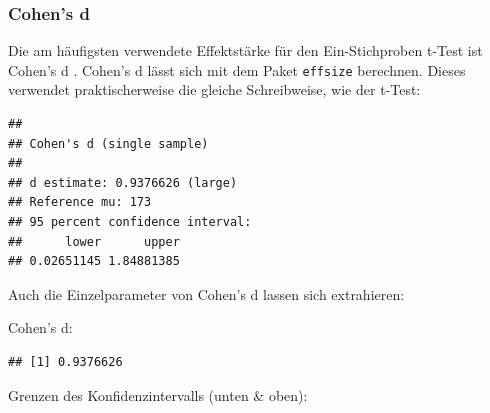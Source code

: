 \documentclass[
]{book}
\newenvironment{Shaded}{\begin{snugshade}}{\end{snugshade}}
\newcommand{\AttributeTok}[1]{\textcolor[rgb]{0.77,0.63,0.00}{#1}}
\newcommand{\ConstantTok}[1]{\textcolor[rgb]{0.00,0.00,0.00}{#1}}
\newcommand{\DecValTok}[1]{\textcolor[rgb]{0.00,0.00,0.81}{#1}}
\newcommand{\FunctionTok}[1]{\textcolor[rgb]{0.00,0.00,0.00}{#1}}
\newcommand{\NormalTok}[1]{#1}
\newcommand{\SpecialCharTok}[1]{\textcolor[rgb]{0.00,0.00,0.00}{#1}}
\begin{document}
\hypertarget{cohens-d}{%
\subsubsection{Cohen's d}\label{cohens-d}}

Die am häufigsten verwendete Effektstärke für den Ein-Stichproben t-Test ist Cohen's d \citet{cohen1988statistical}.
Cohen's d lässt sich mit dem Paket \texttt{effsize} berechnen. Dieses verwendet praktischerweise die gleiche Schreibweise, wie der t-Test:

\begin{Shaded}
\end{Shaded}

\begin{verbatim}
## 
## Cohen's d (single sample)
## 
## d estimate: 0.9376626 (large)
## Reference mu: 173
## 95 percent confidence interval:
##      lower      upper 
## 0.02651145 1.84881385
\end{verbatim}

Auch die Einzelparameter von Cohen's d lassen sich extrahieren:

Cohen's d:

\begin{Shaded}
\end{Shaded}

\begin{verbatim}
## [1] 0.9376626
\end{verbatim}

Grenzen des Konfidenzintervalls (unten \& oben):

\begin{Shaded}
\end{Shaded}
\end{document}
